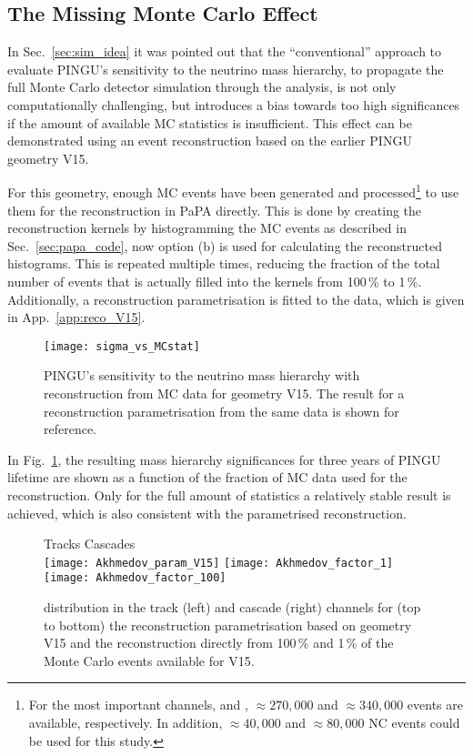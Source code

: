 \subsection{The Missing Monte Carlo Effect}
\label{sec:results_mcstats}

In Sec.~\ref{sec:sim_idea} it was pointed out that the ``conventional''
approach to evaluate PINGU's sensitivity to the neutrino mass hierarchy, \ie to
propagate the full Monte Carlo detector simulation through the analysis, is not
only computationally challenging, but introduces a bias towards too high
significances if the amount of available MC statistics is insufficient. This
effect can be demonstrated using an event reconstruction based on the earlier
PINGU geometry V15.

For this geometry, enough MC events have been generated and
processed\footnote{For the most important channels, \nue and \numu,
$\approx 270,000$ and $\approx 340,000$ events are available, respectively. In
addition, $\approx 40,000$ \nutau and $\approx 80,000$ \nux NC events could be
used for this study.} to use them for the reconstruction in PaPA directly. This
is done by creating the reconstruction kernels by histogramming the MC events
as described in Sec.~\ref{sec:papa_code}, \ie now option (b) is used for
calculating the reconstructed histograms. This is repeated multiple times, 
reducing the fraction of the total number of events that is actually filled into
the kernels from 100\,\% to 1\,\%. Additionally, a reconstruction
parametrisation is fitted to the data, which is given in
App.~\ref{app:reco_V15}.

\begin{figure}[thp]
 \centering
 \texttt{[image: sigma\_vs\_MCstat]}
 \caption{PINGU's sensitivity to the neutrino mass hierarchy with
  reconstruction from MC data for geometry V15. The result for a reconstruction
  parametrisation from the same data is shown for reference.}
 \label{fig:sigma_vs_MCstat}
\end{figure}

In Fig.~\ref{fig:sigma_vs_MCstat}, the resulting mass hierarchy significances
for three years of PINGU lifetime are shown as a function of the fraction of MC
data used for the reconstruction. Only for the full amount of statistics a
relatively stable result is achieved, which is also consistent with the
parametrised reconstruction.

\begin{figure}[p]
 \centering
   Tracks \hspace{5cm} Cascades\\
   \texttt{[image: Akhmedov\_param\_V15]}
   \texttt{[image: Akhmedov\_factor\_1]} 
   \texttt{[image: Akhmedov\_factor\_100]}
 \caption{\delchi distribution in the track (left) and cascade (right) channels
   for (top to bottom) the reconstruction parametrisation based on geometry V15
   and the reconstruction directly from 100\,\% and 1\,\% of the Monte Carlo
   events available for V15.}
 \label{fig:akhmedov_MCstats}
\end{figure}

